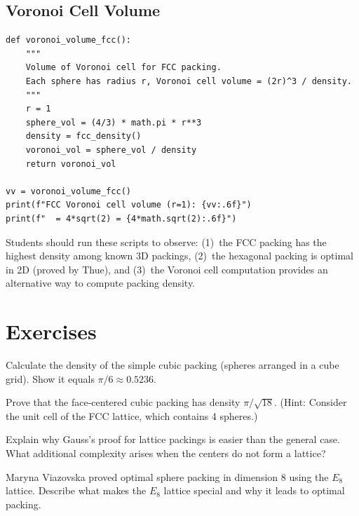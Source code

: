\subsection{Voronoi Cell Volume}

\begin{verbatim}
def voronoi_volume_fcc():
    """
    Volume of Voronoi cell for FCC packing.
    Each sphere has radius r, Voronoi cell volume = (2r)^3 / density.
    """
    r = 1
    sphere_vol = (4/3) * math.pi * r**3
    density = fcc_density()
    voronoi_vol = sphere_vol / density
    return voronoi_vol

vv = voronoi_volume_fcc()
print(f"FCC Voronoi cell volume (r=1): {vv:.6f}")
print(f"  = 4*sqrt(2) = {4*math.sqrt(2):.6f}")
\end{verbatim}

\begin{highlightbox}
Students should run these scripts to observe: (1)~the FCC packing has the highest density among known 3D packings, (2)~the hexagonal packing is optimal in 2D (proved by Thue), and (3)~the Voronoi cell computation provides an alternative way to compute packing density.
\end{highlightbox}

\section{Exercises}

\begin{exercise}[Basic]
Calculate the density of the simple cubic packing (spheres arranged in a cube grid). Show it equals $\pi/6 \approx 0.5236$.
\end{exercise}

\begin{exercise}[Intermediate]
Prove that the face-centered cubic packing has density $\pi/\sqrt{18}$. (Hint: Consider the unit cell of the FCC lattice, which contains 4 spheres.)
\end{exercise}

\begin{exercise}[Challenge]
Explain why Gauss's proof for lattice packings is easier than the general case. What additional complexity arises when the centers do not form a lattice?
\end{exercise}

\begin{exercise}
Maryna Viazovska proved optimal sphere packing in dimension 8 using the $E_8$ lattice. Describe what makes the $E_8$ lattice special and why it leads to optimal packing.
\end{exercise}



